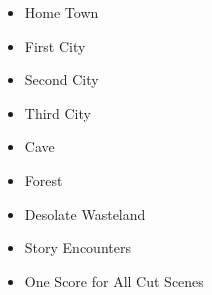 \documentclass[12pt,titlepage]{article}
\newcounter{subsubsubsection}[subsubsection]
\begin{document}
\begin{itemize}
    \item Home Town
    \item First City
    \item Second City
    \item Third City
    \item Cave
    \item Forest
    \item Desolate Wasteland
    \item Story Encounters
\end{itemize}

\begin{itemize}
    \item One Score for All Cut Scenes
\end{itemize}
\end{document}

